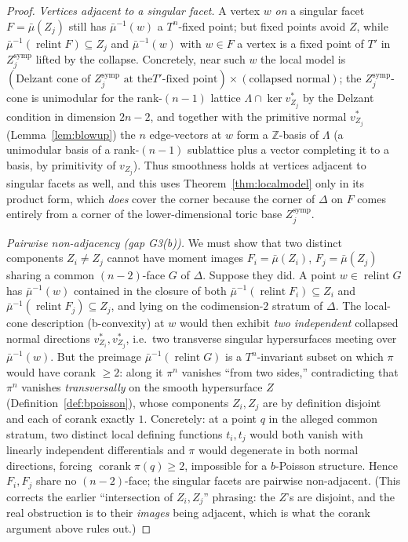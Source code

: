 \documentclass{amsart}
\theoremstyle{definition}
\begin{document}
\begin{proof}
\emph{Vertices adjacent to a singular facet.} A vertex $w$ \emph{on} a singular
facet $F=\bar\mu(Z_j)$ still has $\bar\mu^{-1}(w)$ a $T^n$-fixed point; but
fixed points avoid $Z$, while $\bar\mu^{-1}(\operatorname{relint}F)\subseteq Z_j$
and $\bar\mu^{-1}(w)$ with $w\in F$ a vertex is a fixed point of $T'$ in
$Z_j^{\mathrm{symp}}$ lifted by the collapse. Concretely, near such $w$ the
local model is $(\text{Delzant cone of }Z_j^{\mathrm{symp}}\text{ at the
}T'\text{-fixed point})\times(\text{collapsed normal})$; the
$Z_j^{\mathrm{symp}}$-cone is unimodular for the rank-$(n-1)$ lattice
$\Lambda\cap\ker v^*_{Z_j}$ by the Delzant condition in dimension $2n-2$, and
together with the primitive normal $v^*_{Z_j}$ (Lemma~\ref{lem:blowup}) the $n$
edge-vectors at $w$ form a $\mathbb Z$-basis of $\Lambda$ (a unimodular basis of
a rank-$(n-1)$ sublattice plus a vector completing it to a basis, by primitivity
of $v_{Z_j}$). Thus smoothness holds at vertices adjacent to singular facets as
well, and this uses Theorem~\ref{thm:localmodel} only in its product form,
which \emph{does} cover the corner because the corner of $\Delta$ on $F$ comes
entirely from a corner of the lower-dimensional toric base
$Z_j^{\mathrm{symp}}$.

\emph{Pairwise non-adjacency (gap G3(b)).} We must show that two distinct
components $Z_i\neq Z_j$ cannot have moment images $F_i=\bar\mu(Z_i)$,
$F_j=\bar\mu(Z_j)$ sharing a common $(n-2)$-face $G$ of $\Delta$. Suppose they
did. A point $w\in\operatorname{relint}G$ has $\bar\mu^{-1}(w)$ contained in the
closure of both $\bar\mu^{-1}(\operatorname{relint}F_i)\subseteq Z_i$ and
$\bar\mu^{-1}(\operatorname{relint}F_j)\subseteq Z_j$, and lying on the codimension-$2$
stratum of $\Delta$. The local-cone description (b-convexity) at $w$ would then
exhibit \emph{two independent} collapsed normal directions $v^*_{Z_i},v^*_{Z_j}$,
i.e.\ two transverse singular hypersurfaces meeting over $\bar\mu^{-1}(w)$. But
the preimage $\bar\mu^{-1}(\operatorname{relint}G)$ is a $T^n$-invariant subset
on which $\pi$ would have corank $\ge2$: along it $\pi^n$ vanishes ``from two
sides,'' contradicting that $\pi^n$ vanishes \emph{transversally} on the smooth
hypersurface $Z$ (Definition~\ref{def:bpoisson}), whose components $Z_i,Z_j$
are by definition disjoint and each of corank exactly $1$. Concretely: at a
point $q$ in the alleged common stratum, two distinct local defining functions
$t_i,t_j$ would both vanish with linearly independent differentials and $\pi$
would degenerate in both normal directions, forcing $\operatorname{corank}
\pi(q)\ge2$, impossible for a $b$-Poisson structure. Hence $F_i,F_j$ share no
$(n-2)$-face; the singular facets are pairwise non-adjacent. (This corrects the
earlier ``intersection of $Z_i,Z_j$'' phrasing: the $Z$'s are disjoint, and the
real obstruction is to their \emph{images} being adjacent, which is what the
corank argument above rules out.)


\end{proof}
\end{document}
